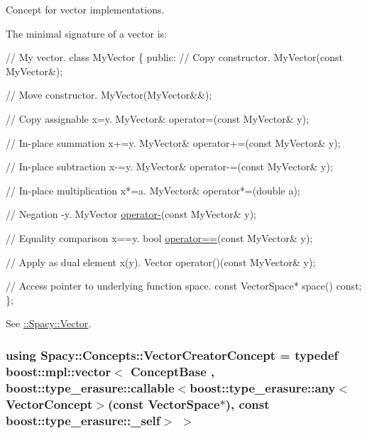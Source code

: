 Concept for vector implementations. 

\label{group__ConceptGroup_gad6958389d1fa2758a8a64a0a24c36004_VectorConceptAnchor}%
\hypertarget{group__ConceptGroup_gad6958389d1fa2758a8a64a0a24c36004_VectorConceptAnchor}{}%
The minimal signature of a vector is\+: 
\begin{DoxyCode}
\textcolor{comment}{// My vector.}
\textcolor{keyword}{class }MyVector
\{
\textcolor{keyword}{public}:
  \textcolor{comment}{// Copy constructor.}
  MyVector(\textcolor{keyword}{const} MyVector&);

  \textcolor{comment}{// Move constructor.}
  MyVector(MyVector&&);

  \textcolor{comment}{// Copy assignable x=y.}
  MyVector& operator=(\textcolor{keyword}{const} MyVector& y);

  \textcolor{comment}{// In-place summation x+=y.}
  MyVector& operator+=(\textcolor{keyword}{const} MyVector& y);

  \textcolor{comment}{// In-place subtraction x-=y.}
  MyVector& operator-=(\textcolor{keyword}{const} MyVector& y);

  \textcolor{comment}{// In-place multiplication x*=a.}
  MyVector& operator*=(\textcolor{keywordtype}{double} a);

  \textcolor{comment}{// Negation -y.}
  MyVector \hyperlink{namespaceSpacy_a8bc98f51c7beab86185bf97a29b36395}{operator-}(\textcolor{keyword}{const} MyVector& y);

  \textcolor{comment}{// Equality comparison x==y.}
  \textcolor{keywordtype}{bool} \hyperlink{namespaceSpacy_aef4930427aac4c8089b4c43b1c97cf25}{operator==}(\textcolor{keyword}{const} MyVector& y);

  \textcolor{comment}{// Apply as dual element x(y).}
  Vector operator()(\textcolor{keyword}{const} MyVector& y);

  \textcolor{comment}{// Access pointer to underlying function space.}
  \textcolor{keyword}{const} VectorSpace* space() \textcolor{keyword}{const};
\};
\end{DoxyCode}


See \hyperlink{group__SpacyGroup_gafc144d2730ef87a67e54f8cd750b1f54_VectorAnchor}{\+:\+:Spacy\+:\+:Vector}. \hypertarget{group__ConceptGroup_ga3064301642b7c66b1b08f88a12a04645_ga3064301642b7c66b1b08f88a12a04645}{}
\subsubsection[{Vector\+Creator\+Concept}]{\setlength{\rightskip}{0pt plus 5cm}using {\bf Spacy\+::\+Concepts\+::\+Vector\+Creator\+Concept} = typedef boost\+::mpl\+::vector$<$ Concept\+Base , boost\+::type\+\_\+erasure\+::callable$<$boost\+::type\+\_\+erasure\+::any$<$Vector\+Concept$>$(const Vector\+Space$\ast$), const boost\+::type\+\_\+erasure\+::\+\_\+self$>$ $>$}\label{group__ConceptGroup_ga3064301642b7c66b1b08f88a12a04645_ga3064301642b7c66b1b08f88a12a04645}


